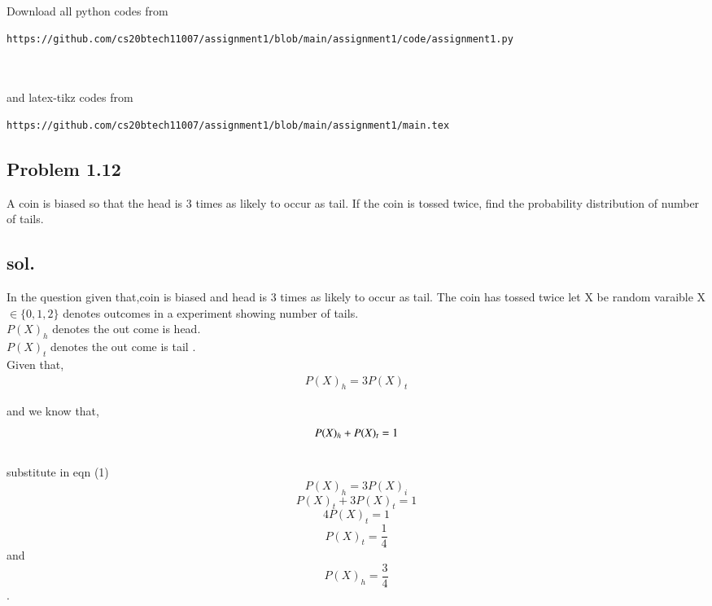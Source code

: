 \documentclass[journal,14pt,twocolumn]{IEEEtran}
\begin{document}
\maketitle
\newpage
\bigskip
\renewcommand{\thefigure}{\theenumi}
\renewcommand{\thetable}{\theenumi}
Download all python codes from 
\begin{lstlisting}
https://github.com/cs20btech11007/assignment1/blob/main/assignment1/code/assignment1.py



\end{lstlisting}
%
and latex-tikz codes from 
%
\begin{lstlisting}
https://github.com/cs20btech11007/assignment1/blob/main/assignment1/main.tex

\end{lstlisting}
\begin{center}
\section*{Problem 1.12}
\end{center}
A coin is biased so that the head is 3 times
as likely to occur as tail. If the coin is tossed
twice, find the probability distribution of
number of tails.\\

\subsection*{sol.}
 In the question given that,coin is biased and head is 3 times as likely to occur as tail.
The coin has tossed twice 
let X be random varaible X$\in\{0,1,2 \}$ denotes outcomes  in a experiment showing number of tails.\\
$P(X)_h$   denotes the out come is head.\\
$P(X)_t$    denotes the out come is tail .\\
Given that,
\begin{align}
P(X)_h=3P(X)_t
 \end{align}

and we know that,
\begin{equation}
 P(X)_{h} +P(X)_{t}=1\\
\end{equation}\\

substitute in eqn (1)$$P(X)_h=3P(X)_i $$ 
$$P(X)_t+3P(X)_t=1$$
$$4P(X)_t=1$$
$$ P(X)_t=\frac{1}{4}$$
and $$P(X)_h=\frac{3}{4}$$.\\
\end{document}
